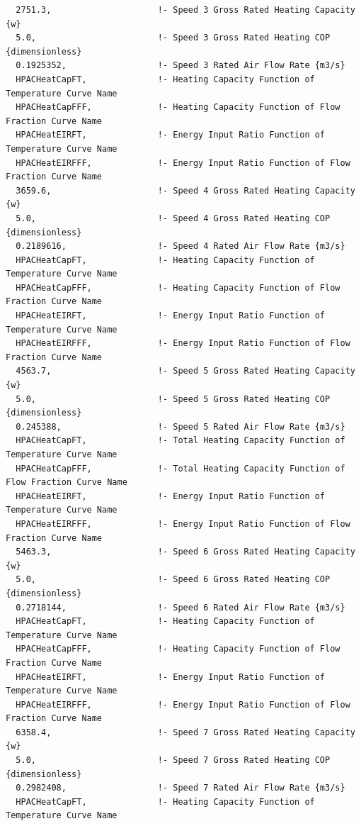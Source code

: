 \begin{lstlisting}
  2751.3,                     !- Speed 3 Gross Rated Heating Capacity {w}
  5.0,                        !- Speed 3 Gross Rated Heating COP {dimensionless}
  0.1925352,                  !- Speed 3 Rated Air Flow Rate {m3/s}
  HPACHeatCapFT,              !- Heating Capacity Function of Temperature Curve Name
  HPACHeatCapFFF,             !- Heating Capacity Function of Flow Fraction Curve Name
  HPACHeatEIRFT,              !- Energy Input Ratio Function of Temperature Curve Name
  HPACHeatEIRFFF,             !- Energy Input Ratio Function of Flow Fraction Curve Name
  3659.6,                     !- Speed 4 Gross Rated Heating Capacity {w}
  5.0,                        !- Speed 4 Gross Rated Heating COP {dimensionless}
  0.2189616,                  !- Speed 4 Rated Air Flow Rate {m3/s}
  HPACHeatCapFT,              !- Heating Capacity Function of Temperature Curve Name
  HPACHeatCapFFF,             !- Heating Capacity Function of Flow Fraction Curve Name
  HPACHeatEIRFT,              !- Energy Input Ratio Function of Temperature Curve Name
  HPACHeatEIRFFF,             !- Energy Input Ratio Function of Flow Fraction Curve Name
  4563.7,                     !- Speed 5 Gross Rated Heating Capacity {w}
  5.0,                        !- Speed 5 Gross Rated Heating COP {dimensionless}
  0.245388,                   !- Speed 5 Rated Air Flow Rate {m3/s}
  HPACHeatCapFT,              !- Total Heating Capacity Function of Temperature Curve Name
  HPACHeatCapFFF,             !- Total Heating Capacity Function of Flow Fraction Curve Name
  HPACHeatEIRFT,              !- Energy Input Ratio Function of Temperature Curve Name
  HPACHeatEIRFFF,             !- Energy Input Ratio Function of Flow Fraction Curve Name
  5463.3,                     !- Speed 6 Gross Rated Heating Capacity {w}
  5.0,                        !- Speed 6 Gross Rated Heating COP {dimensionless}
  0.2718144,                  !- Speed 6 Rated Air Flow Rate {m3/s}
  HPACHeatCapFT,              !- Heating Capacity Function of Temperature Curve Name
  HPACHeatCapFFF,             !- Heating Capacity Function of Flow Fraction Curve Name
  HPACHeatEIRFT,              !- Energy Input Ratio Function of Temperature Curve Name
  HPACHeatEIRFFF,             !- Energy Input Ratio Function of Flow Fraction Curve Name
  6358.4,                     !- Speed 7 Gross Rated Heating Capacity {w}
  5.0,                        !- Speed 7 Gross Rated Heating COP {dimensionless}
  0.2982408,                  !- Speed 7 Rated Air Flow Rate {m3/s}
  HPACHeatCapFT,              !- Heating Capacity Function of Temperature Curve Name

\end{lstlisting}
